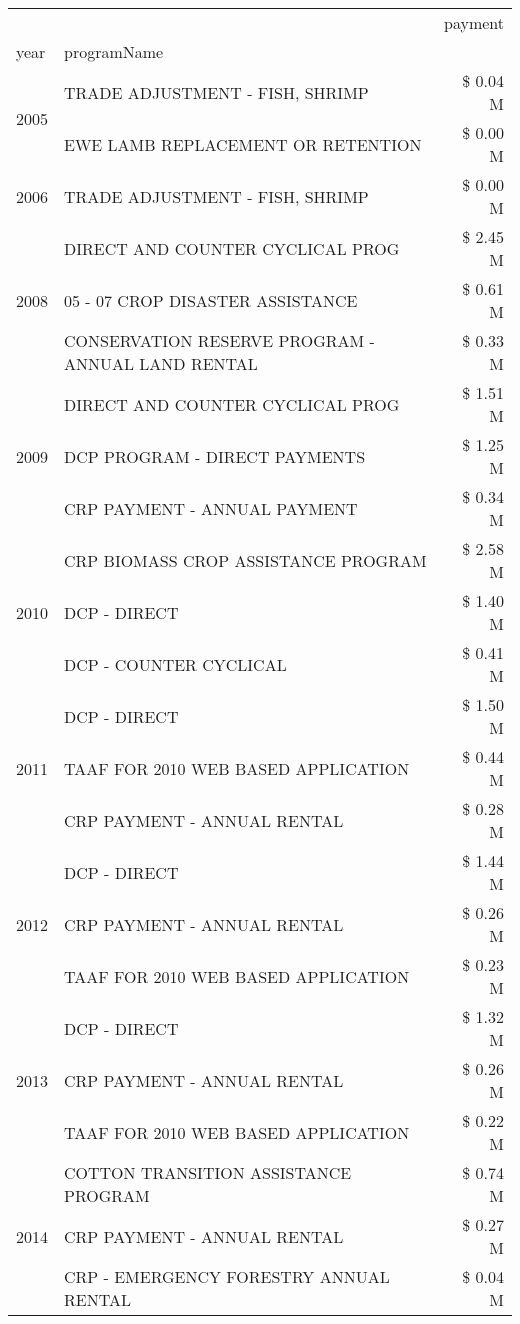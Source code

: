\begin{tabular}{llr}
\toprule
 &  & payment \\
year & programName &  \\
\midrule
\multirow[t]{2}{*}{2005} & TRADE ADJUSTMENT - FISH, SHRIMP & \$ 0.04 M \\
 & EWE LAMB REPLACEMENT OR RETENTION & \$ 0.00 M \\
\cline{1-3}
2006 & TRADE ADJUSTMENT - FISH, SHRIMP & \$ 0.00 M \\
\cline{1-3}
\multirow[t]{3}{*}{2008} & DIRECT AND COUNTER CYCLICAL PROG & \$ 2.45 M \\
 & 05 - 07 CROP DISASTER ASSISTANCE & \$ 0.61 M \\
 & CONSERVATION RESERVE PROGRAM - ANNUAL LAND RENTAL & \$ 0.33 M \\
\cline{1-3}
\multirow[t]{3}{*}{2009} & DIRECT AND COUNTER CYCLICAL PROG & \$ 1.51 M \\
 & DCP PROGRAM - DIRECT PAYMENTS & \$ 1.25 M \\
 & CRP PAYMENT - ANNUAL PAYMENT & \$ 0.34 M \\
\cline{1-3}
\multirow[t]{3}{*}{2010} & CRP BIOMASS CROP ASSISTANCE PROGRAM & \$ 2.58 M \\
 & DCP - DIRECT & \$ 1.40 M \\
 & DCP - COUNTER CYCLICAL & \$ 0.41 M \\
\cline{1-3}
\multirow[t]{3}{*}{2011} & DCP - DIRECT & \$ 1.50 M \\
 & TAAF FOR 2010 WEB BASED APPLICATION & \$ 0.44 M \\
 & CRP PAYMENT - ANNUAL RENTAL & \$ 0.28 M \\
\cline{1-3}
\multirow[t]{3}{*}{2012} & DCP - DIRECT & \$ 1.44 M \\
 & CRP PAYMENT - ANNUAL RENTAL & \$ 0.26 M \\
 & TAAF FOR 2010 WEB BASED APPLICATION & \$ 0.23 M \\
\cline{1-3}
\multirow[t]{3}{*}{2013} & DCP - DIRECT & \$ 1.32 M \\
 & CRP PAYMENT - ANNUAL RENTAL & \$ 0.26 M \\
 & TAAF FOR 2010 WEB BASED APPLICATION & \$ 0.22 M \\
\cline{1-3}
\multirow[t]{3}{*}{2014} & COTTON TRANSITION ASSISTANCE PROGRAM & \$ 0.74 M \\
 & CRP PAYMENT - ANNUAL RENTAL & \$ 0.27 M \\
 & CRP - EMERGENCY FORESTRY ANNUAL RENTAL & \$ 0.04 M \\
\cline{1-3}

\end{tabular}
